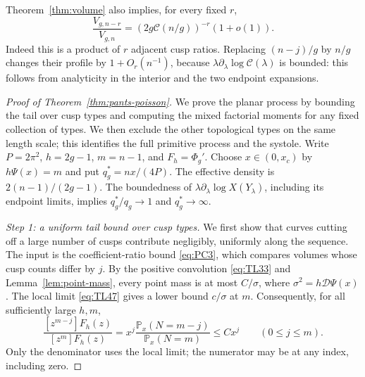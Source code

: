 Theorem~\ref{thm:volume} also implies, for every fixed $r$,
\begin{equation}
 \frac{V_{g,n-r}}{V_{g,n}}
  =(2g\mathcal C(n/g))^{-r}(1+o(1)).
 \label{eq:PS5}
\end{equation}
Indeed this is a product of $r$ adjacent cusp ratios. Replacing $(n-j)/g$
by $n/g$ changes their profile by $1+O_r(n^{-1})$, because
$\lambda\partial_\lambda\log\mathcal C(\lambda)$ is bounded: this follows
from analyticity in the interior and the two endpoint expansions.

\begin{proof}[Proof of Theorem~\ref{thm:pants-poisson}]
We prove the planar process by bounding the tail over cusp types and
computing the mixed factorial moments for any fixed collection of types.
We then exclude the other topological types on the same length scale;
this identifies the full primitive process and the systole. Write $P=2\pi^2$, $h=2g-1$, $m=n-1$, and $F_h=\Phi_g'$.
Choose $x\in(0,x_c)$ by $h\Psi(x)=m$ and put $q_g^*=nx/(4P)$.
The effective density is $2(n-1)/(2g-1)$. The boundedness of
$\lambda\partial_\lambda\log X(Y_\lambda)$, including its endpoint limits, implies
$q_g^*/q_g\to1$ and $q_g^*\to\infty$.

\emph{Step 1: a uniform tail bound over cusp types.}
We first show that curves cutting off a large number of cusps contribute
negligibly, uniformly along the sequence. The input is the
coefficient-ratio bound \eqref{eq:PC3}, which compares volumes whose cusp
counts differ by $j$.
By the positive convolution \eqref{eq:TL33} and
Lemma~\ref{lem:point-mass}, every point mass is at most $C/\sigma$,
where $\sigma^2=h\mathscr D\Psi(x)$. The local limit
\eqref{eq:TL47} gives a lower bound $c/\sigma$ at $m$.
Consequently, for all sufficiently large $h,m$,
\begin{equation}
 \frac{[z^{m-j}]F_h(z)}{[z^m]F_h(z)}
 =x^j\frac{\mathbb P_x(N=m-j)}{\mathbb P_x(N=m)}
 \le Cx^j\qquad(0\le j\le m).
 \label{eq:PC3}
\end{equation}
Only the denominator uses the local limit; the numerator may be at any
index, including zero.


\end{proof}
